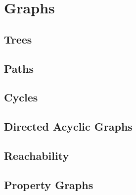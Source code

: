 \section{Graphs}



\subsection{Trees}

\subsection{Paths}

\subsection{Cycles}

\subsection{Directed Acyclic Graphs}

\subsection{Reachability}

\subsection{Property Graphs}

